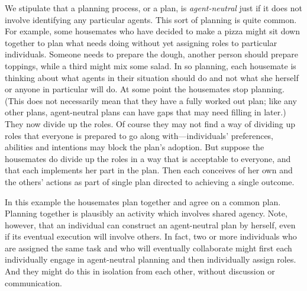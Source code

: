 \documentclass[12pt,\papersize]{extarticle}
\begin{document}

We stipulate that a planning process, or a plan, is \emph{agent-neutral} just if it does not involve identifying any particular agents.  
This sort of planning is quite common.
For example, some housemates who have decided to make a pizza might sit down together to plan what needs doing without yet assigning roles to particular individuals. 
Someone needs to prepare the dough, 
another person should prepare toppings,
while a third might mix some salad.
In so planning, each housemate is thinking about what 
agents in their situation should do 
and not what she herself or anyone in particular will do.  
At some point the housemates stop planning.
(This does not necessarily mean that they have a fully worked out plan; like any other plans, agent-neutral plans can have gaps that may need filling in later.)
They now divide up the roles.
Of course they may not find a way of dividing up roles that everyone is prepared to go along with---individuals' preferences, abilities and intentions may block the plan's adoption.
But suppose the housemates do divide up the roles in a way that is acceptable to everyone, 
	and that each implements her part in the plan.
Then each conceives of her own and the others' actions as part of single plan directed to achieving a single outcome.

In this example
	the housemates plan together and agree on a common plan.
	Planning together is plausibly an activity which involves shared agency.
	Note, however, that an individual can construct an agent-neutral plan by herself, even if its eventual execution will involve others. 
	In fact, two or more individuals who are assigned the same task and who will eventually collaborate might first each individually engage in agent-neutral planning and then individually assign roles.
	And they might do this in isolation from each other, without discussion or communication.
\end{document}
